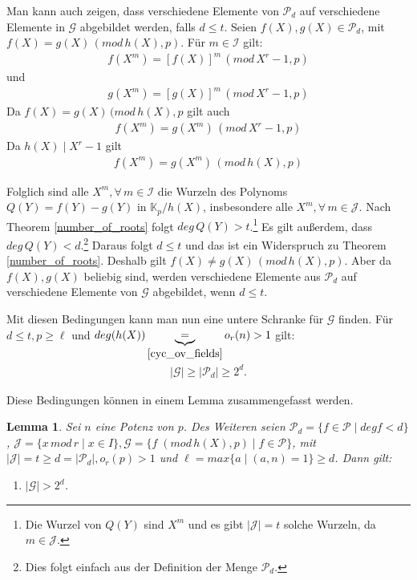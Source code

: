 \documentclass[12pt,oneside]{article}
\newtheorem{lemma}[theorem]{Lemma}
\theoremstyle{remark}
\theoremstyle{definition}
\begin{document}
\begin{flushleft}
Man kann auch zeigen, dass verschiedene Elemente von $\mathcal{P}_d$ auf verschiedene Elemente in $\mathcal{G}$ abgebildet werden, falls $d \leq t$. Seien $f(X),g(X) \in \mathcal{P}_{d}$, mit $f(X) = g(X) \, (mod \, h(X),p)$. Für $m \in \mathcal{I}$ gilt:
\begin{align*}
    f(X^m) = [f(X)]^{m} \, (mod \,X^{r} - 1,p)
\end{align*}
und
\begin{align*}
    g(X^m) = [g(X)]^{m} \, (mod \, X^{r} - 1,p)
\end{align*}
Da $f(X) = g(X) \, (mod \, h(X),p$ gilt auch
\begin{align*}
    f(X^m) = g(X^m) \, (mod \, X^{r} - 1,p)
\end{align*}
Da $h(X) \mid X^{r} - 1$ gilt
\begin{align*}
    f(X^m) = g(X^m) \, (mod \, h(X),p)
\end{align*}

Folglich sind alle $X^m, \forall \, m \in \mathcal{I}$ die Wurzeln des Polynoms $Q(Y) = f(Y) - g(Y)$ in $\mathbb{K}_p/h(X)$, insbesondere alle $X^m, \forall \, m \in \mathcal{J}$. Nach Theorem \ref{number_of_roots} folgt $deg \, Q(Y) > t$.\footnote{Die Wurzel von $Q(Y)$ sind $X^m$ und es gibt $|\mathcal{J}| = t$ solche Wurzeln, da $m \in \mathcal{J}$.} Es gilt außerdem, dass $deg \, Q(Y) < d$.\footnote{Dies folgt einfach aus der Definition der Menge $\mathcal{P}_d$.} Daraus folgt $d \leq t$ und das ist ein Widerspruch zu Theorem \ref{number_of_roots}. Deshalb gilt $f(X) \neq g(X) \, (mod \, h(X),p)$. Aber da $f(X),g(X)$ beliebig sind, werden verschiedene Elemente aus $\mathcal{P}_d$ auf verschiedene Elemente von $\mathcal{G}$ abgebildet, wenn $d \leq t$.

Mit diesen Bedingungen kann man nun eine untere Schranke für $\mathcal{G}$ finden. Für $d \leq t,p \geq \ell$ und $deg(h(X))\underbrace{=}_{\ref{cyc_ov_fields}} o_{r}(n) > 1$ gilt:
\begin{align*}
|\mathcal{G}| \geq |\mathcal{P}_{d}| \geq  2^d.
\end{align*}

Diese Bedingungen können in einem Lemma zusammengefasst werden.

\begin{lemma}\label{second-group-first-bound}
Sei $n$ eine Potenz von $p$. Des Weiteren seien $\mathcal{P}_{d} = \{ f \in \mathcal{P} \mid deg f < d \}$, $\mathcal{J} = \{ x \, mod \, r \mid x \in I\}, \mathcal{G} = \{f \; (mod \, h(X), p) \mid f \in \mathcal{P} \}$, mit $|\mathcal{J}| = t \geq d = |\mathcal{P}_{d}|, o_{r}(p) > 1$ und $\ell= max \{a \mid (a,n)= 1\} \geq d$. Dann gilt:
\begin{enumerate}
\item $|\mathcal{G}| > 2^d$.\newline


\end{enumerate}
\end{lemma}
\end{flushleft}
\end{document}
